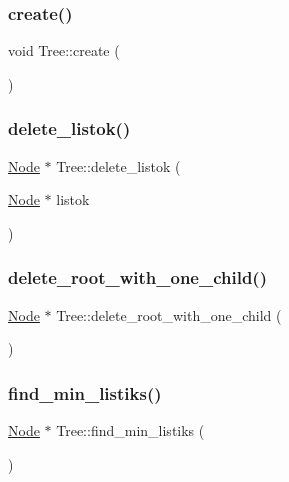 \subsubsection{\texorpdfstring{create()}{create()}}
{\footnotesize\ttfamily void Tree\+::create (\begin{DoxyParamCaption}{ }\end{DoxyParamCaption})}

\mbox{\label{class_tree_a0059ab7470d1df6b88ec6d275067bcdb}} 
\subsubsection{\texorpdfstring{delete\+\_\+listok()}{delete\_listok()}}
{\footnotesize\ttfamily \mbox{\hyperlink{class_node}{Node}} $\ast$ Tree\+::delete\+\_\+listok (\begin{DoxyParamCaption}\item[{\mbox{\hyperlink{class_node}{Node}} $\ast$}]{listok }\end{DoxyParamCaption})}

\mbox{\label{class_tree_ae0a6d8260dafecfd861410bfee87a868}} 
\subsubsection{\texorpdfstring{delete\+\_\+root\+\_\+with\+\_\+one\+\_\+child()}{delete\_root\_with\_one\_child()}}
{\footnotesize\ttfamily \mbox{\hyperlink{class_node}{Node}} $\ast$ Tree\+::delete\+\_\+root\+\_\+with\+\_\+one\+\_\+child (\begin{DoxyParamCaption}{ }\end{DoxyParamCaption})}

\mbox{\label{class_tree_ab640efe82cc69b28a9ddd61ac4410a89}} 
\subsubsection{\texorpdfstring{find\+\_\+min\+\_\+listiks()}{find\_min\_listiks()}}
{\footnotesize\ttfamily \mbox{\hyperlink{class_node}{Node}} $\ast$ Tree\+::find\+\_\+min\+\_\+listiks (\begin{DoxyParamCaption}{ }\end{DoxyParamCaption})}

